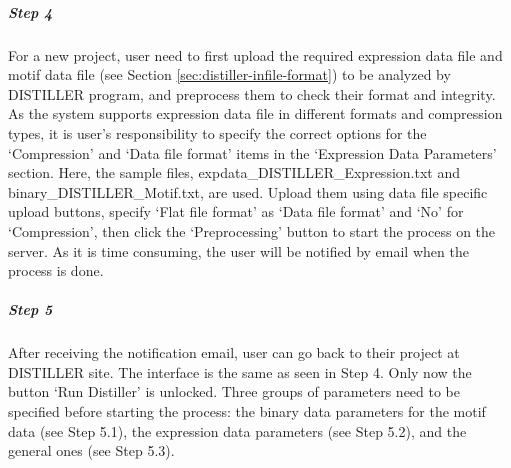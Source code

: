 \begin{small} %
\subparagraph{Step 4} For a new project, user need to first upload the required 
expression data file and motif data file (see Section
\ref{sec:distiller-infile-format}) to be analyzed by DISTILLER program, and
preprocess them to check their format and integrity.  As the system supports
expression data file in different formats and compression types, it is user's
responsibility to specify the correct options for the `Compression' and `Data
file format' items in the `Expression Data Parameters' section.
%
Here, the sample files, expdata\_DISTILLER\_Expression.txt and
binary\_DISTILLER\_Motif.txt, are used.  Upload them using data file specific
upload buttons, specify `Flat file format' as `Data file format' and `No' for
`Compression', then click the `Preprocessing' button to start the process on
the server.
%
As it is time consuming, the user will be notified by email when the process
is done.


\subparagraph{Step 5} After receiving the notification email, user can go back to 
their project at DISTILLER site.  The interface is the same as seen in Step 4.
Only now the button `Run Distiller' is unlocked.  Three groups of parameters
need to be specified before starting the process: the binary data parameters
for the motif data (see Step 5.1), the expression data parameters (see Step
5.2), and the general ones (see Step 5.3).



\end{small}
